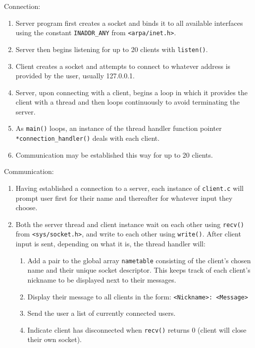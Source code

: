 \documentclass[titlepage, 14pt]{article}
\begin{document}
\begin{center}
  Connection:
\end{center}
\begin{enumerate}
\item Server program first creates a socket and binds it to all available interfaces using the constant \verb|INADDR_ANY| from \verb|<arpa/inet.h>|.
\item Server then begins listening for up to 20 clients with \verb|listen()|.
\item Client creates a socket and attempts to connect to whatever address is provided by the user, usually 127.0.0.1.
\item Server, upon connecting with a client, begins a loop in which it provides the client with a thread and then loops continuously to avoid terminating the server.
\item As \verb|main()| loops, an instance of the thread handler function pointer \verb|*connection_handler()| deals with each client.
\item Communication may be established this way for up to 20 clients.
\end{enumerate}

\begin{center}
Communication:
\end{center}
\begin{enumerate}
\item Having established a connection to a server, each instance of \verb|client.c| will prompt user first for their name and thereafter for whatever input they choose.
\item Both the server thread and client instance wait on each other using \verb|recv()| from \verb|<sys/socket.h>|, and write to each other using \verb|write()|. After client input is sent, depending on what it is, the thread handler will:
  \begin{enumerate} 
    \item Add a pair to the global array \verb|nametable| consisting of the client's chosen name and their unique socket descriptor. This keeps track of each client's nickname to be displayed next to their messages.
    \item Display their message to all clients in the form: \verb|<Nickname>: <Message>|
    \item Send the user a list of currently connected users.
    \item Indicate client has disconnected when \verb|recv()| returns 0 (client will close their own socket).
    \end{enumerate}
\end{enumerate}
\end{document}
